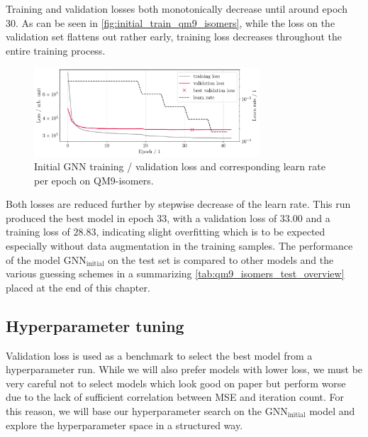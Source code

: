 Training and validation losses both monotonically decrease until around epoch 30. As can be seen in \autoref{fig:initial_train_qm9_isomers}, while the loss on the validation set flattens out rather early, training loss decreases throughout the entire training process. 
\begin{figure}[H]
    \centering
    \includegraphics[width=0.75\textwidth]{../fig/gnn/MGNN_6-31G_NO_AUG_07_07_manual_ref_train_val_loss.pdf}
    \caption[Initial GNN loss on QM9-isomers]{Initial GNN training / validation loss and corresponding learn rate per epoch on QM9-isomers.}
    \label{fig:initial_train_qm9_isomers}
\end{figure}
Both losses are reduced further by stepwise decrease of the learn rate. This run produced the best model in epoch 33, with a validation loss of $33.00$ and a training loss of $28.83$, indicating slight overfitting which is to be expected especially without data augmentation in the training samples. The performance of the model $\text{GNN}_\text{initial}$ on the test set is compared to other models and the various guessing schemes in a summarizing \autoref{tab:qm9_isomers_test_overview} placed at the end of this chapter. 

\subsection{Hyperparameter tuning}
\label{subsec:qm9_isomers_hyperparamtuning}
Validation loss is used as a benchmark to select the best model from a hyperparameter run. While we will also prefer models with lower loss, we must be very careful not to select models which look good on paper but perform worse due to the lack of sufficient correlation between MSE and iteration count. For this reason, we will base our hyperparameter search on the $\text{GNN}_\text{initial}$ model and explore the hyperparameter space in a structured way. 

